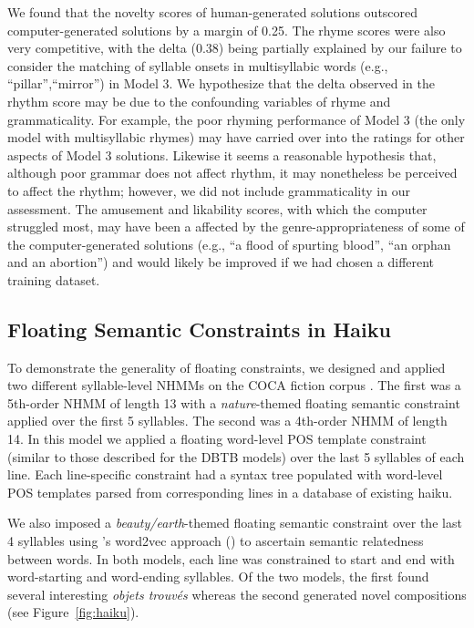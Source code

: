 \documentclass[phd,electronic,oneside,twosidetoc,letterpaper,chaptercenter,parttop,lol,lof,lot]{byumsphd}
\begin{document}
We found that the novelty scores of human-generated solutions outscored computer-generated solutions by a margin of 0.25. The rhyme scores were also very competitive, with the delta (0.38) being partially explained by our failure to consider the matching of syllable onsets in multisyllabic words (e.g., ``pillar'',``mirror'') in Model 3. We hypothesize that the delta observed in the rhythm score may be due to the confounding variables of rhyme and grammaticality. For example, the poor rhyming performance of Model 3 (the only model with multisyllabic rhymes) may have carried over into the ratings for other aspects of Model 3 solutions. Likewise it seems a reasonable hypothesis that, although poor grammar does not affect rhythm, it may nonetheless be perceived to affect the rhythm; however, we did not include grammaticality in our assessment. The amusement and likability scores, with which the computer struggled most, may have been a affected by the genre-appropriateness of some of the computer-generated solutions (e.g., ``a flood of spurting blood'', ``an orphan and an abortion'') and would likely be improved if we had chosen a different training dataset.

\subsection{Floating Semantic Constraints in Haiku}

To demonstrate the generality of floating constraints, we designed and applied two different syllable-level NHMMs on the COCA fiction corpus \cite{davies2009385+}. The first was a 5th-order NHMM of length 13 with a \textit{nature}-themed floating semantic constraint applied over the first 5 syllables. The second was a 4th-order NHMM of length 14. In this model we applied a floating word-level POS template constraint (similar to those described for the DBTB models) over the last 5 syllables of each line. Each line-specific constraint had a syntax tree populated with word-level POS templates parsed from corresponding lines in a database of existing haiku. 

We also imposed a \textit{beauty/earth}-themed floating semantic constraint over the last 4 syllables using \citeauthor{mikolov2013distributed}'s word2vec approach  (\citeyear{mikolov2013distributed}) to ascertain semantic relatedness between words. In both models, each line was constrained to start and end with word-starting and word-ending syllables. Of the two models, the first found several interesting \textit{objets trouv\'es} whereas the second generated novel compositions (see Figure~\ref{fig:haiku}).
\end{document}
